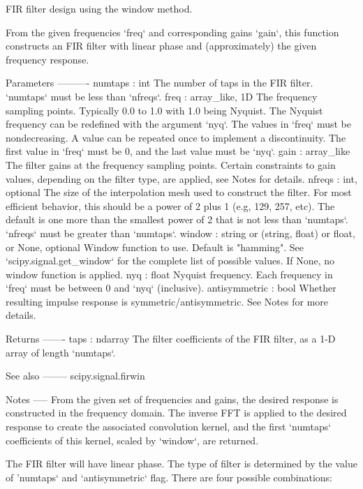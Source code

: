 \begin{DoxyVerb}FIR filter design using the window method.

From the given frequencies `freq` and corresponding gains `gain`,
this function constructs an FIR filter with linear phase and
(approximately) the given frequency response.

Parameters
----------
numtaps : int
    The number of taps in the FIR filter.  `numtaps` must be less than
    `nfreqs`.
freq : array_like, 1D
    The frequency sampling points. Typically 0.0 to 1.0 with 1.0 being
    Nyquist.  The Nyquist frequency can be redefined with the argument
    `nyq`.
    The values in `freq` must be nondecreasing.  A value can be repeated
    once to implement a discontinuity.  The first value in `freq` must
    be 0, and the last value must be `nyq`.
gain : array_like
    The filter gains at the frequency sampling points. Certain
    constraints to gain values, depending on the filter type, are applied,
    see Notes for details.
nfreqs : int, optional
    The size of the interpolation mesh used to construct the filter.
    For most efficient behavior, this should be a power of 2 plus 1
    (e.g, 129, 257, etc).  The default is one more than the smallest
    power of 2 that is not less than `numtaps`.  `nfreqs` must be greater
    than `numtaps`.
window : string or (string, float) or float, or None, optional
    Window function to use. Default is "hamming".  See
    `scipy.signal.get_window` for the complete list of possible values.
    If None, no window function is applied.
nyq : float
    Nyquist frequency.  Each frequency in `freq` must be between 0 and
    `nyq` (inclusive).
antisymmetric : bool
    Whether resulting impulse response is symmetric/antisymmetric.
    See Notes for more details.

Returns
-------
taps : ndarray
    The filter coefficients of the FIR filter, as a 1-D array of length
    `numtaps`.

See also
--------
scipy.signal.firwin

Notes
-----
From the given set of frequencies and gains, the desired response is
constructed in the frequency domain.  The inverse FFT is applied to the
desired response to create the associated convolution kernel, and the
first `numtaps` coefficients of this kernel, scaled by `window`, are
returned.

The FIR filter will have linear phase. The type of filter is determined by
the value of 'numtaps` and `antisymmetric` flag.
There are four possible combinations:


\end{DoxyVerb}
